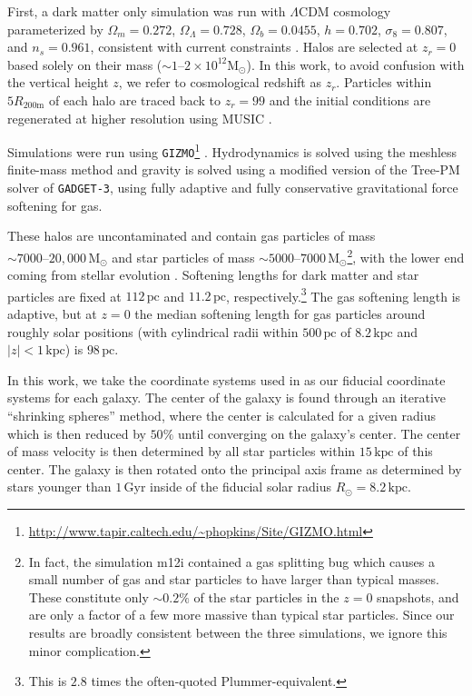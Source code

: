 \documentclass[twocolumn]{aastex62}
\newcommand{\Msun}{\text{M}_\odot}
\newcommand{\pc}{\text{pc}}
\newcommand{\kpc}{\text{kpc}}
\newcommand{\Gyr}{\text{Gyr}}
\newcommand{\abs}[1]{\left| #1 \right|}
\newcommand{\z}{z_r}
\begin{document}
First, a dark matter only simulation was run with $\Lambda$CDM cosmology
parameterized by $\Omega_m = 0.272$, $\Omega_{\Lambda} = 0.728$, $\Omega_b =
0.0455$, $h = 0.702$, $\sigma_8 = 0.807$, and $n_s = 0.961$, consistent with
current constraints \citep{2018arXiv180706209P}. Halos are selected at $\z=0$
based solely on their mass ($\sim 1\text{--}2 \times 10^{12} \Msun$). In this
work, to avoid confusion with the vertical height $z$, we refer to
cosmological redshift as $\z$. Particles within $5 R_{200\text{m}}$ of each
halo are traced back to $\z=99$ and the initial conditions are regenerated at
higher resolution using MUSIC \citep{2011MNRAS.415.2101H}.

Simulations were run using
\texttt{GIZMO}\footnote{\url{http://www.tapir.caltech.edu/~phopkins/Site/GIZMO.html}}
\citep{2015MNRAS.450...53H}. Hydrodynamics is solved using the meshless
finite-mass method and gravity is solved using a modified version of the
Tree-PM solver of \texttt{GADGET-3}, using fully adaptive and fully
conservative gravitational force softening for gas.

These halos are uncontaminated and contain gas particles of mass $\sim 7000
\text{--} 20,000\,\Msun$ and star particles of mass $\sim 5000 \text{--} 7000\,
\Msun$\footnote{In fact, the simulation m12i contained a gas
splitting bug which causes a small number of gas and star particles to have
larger than typical masses. These constitute only $\sim0.2\%$ of the star
particles in the $z=0$ snapshots, and are only a factor of a few more massive
than typical star particles. Since our results are broadly consistent between
the three simulations, we ignore this minor complication.}, with the lower end
coming from stellar evolution \citep{2018arXiv180610564S}. Softening lengths
for dark matter and star particles are fixed at $112\,\pc$ and $11.2\,\pc$,
respectively.\footnote{This is $2.8$ times the often-quoted
Plummer-equivalent.} The gas softening length is adaptive, but at $z=0$ the
median softening length for gas particles around roughly solar positions (with
cylindrical radii within $500\,\pc$ of $8.2\,\kpc$ and $\abs{z}<1\,\kpc$) is
$98\,\pc$.

In this work, we take the coordinate systems used in
\citet{2018arXiv180610564S} as our fiducial coordinate systems for each
galaxy. The center of the galaxy is found through an iterative ``shrinking
spheres'' method, where the center is calculated for a given radius which is
then reduced by $50\%$ until converging on the galaxy's center. The center of
mass velocity is then determined by all star particles within $15\,\kpc$ of
this center. The galaxy is then rotated onto the principal axis frame as
determined by stars younger than $1\,\Gyr$ inside of the fiducial solar radius
$R_{\odot} = 8.2\,\kpc$.
\end{document}
